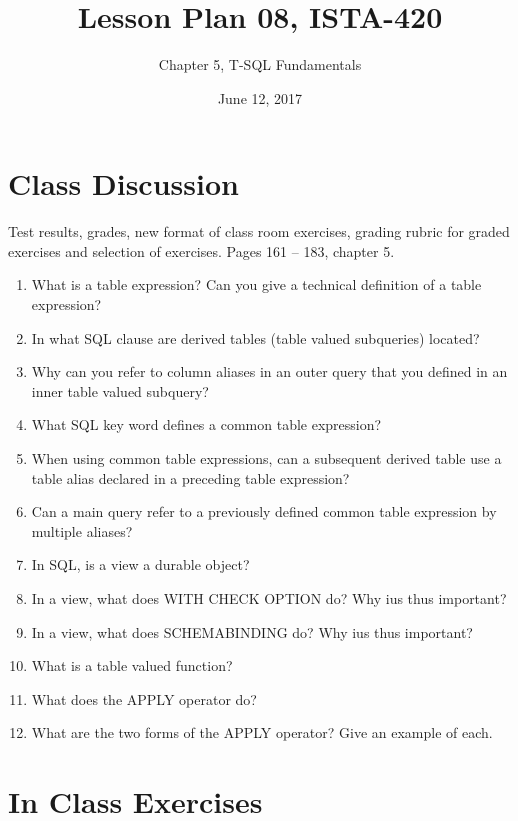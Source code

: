\documentclass{article}
\title{Lesson Plan 08, ISTA-420}
\author{Chapter 5, T-SQL Fundamentals}
\date{June 12, 2017}
\begin{document}
    

    \maketitle{}

    \section{Class Discussion}

    Test results, grades, new format of class room exercises, grading rubric for graded exercises and selection of  exercises. 
    Pages 161 -- 183, chapter 5.

    \begin{enumerate}
        \item What is a table expression? Can you give a technical definition of a table expression?
        \item In what SQL clause are derived tables (table valued subqueries) located?
        \item Why can you refer to column aliases in an outer query that you defined in an inner table valued subquery?
        \item What SQL key word defines a common table expression?
        \item When using common table expressions, can a subsequent derived table use a table alias declared in a preceding table expression?
        \item Can a main query refer to a previously defined common table expression by multiple aliases?
        \item In SQL, is a view a durable object?
        \item In a view, what does WITH CHECK OPTION do? Why ius thus important?
        \item In a view, what does SCHEMABINDING do? Why ius thus important?
        \item What is a table valued function?
        \item What does the APPLY operator do?
        \item What are the two forms of the APPLY operator? Give an example of each.
    \end{enumerate}

    \section{In Class Exercises}
\end{document}
